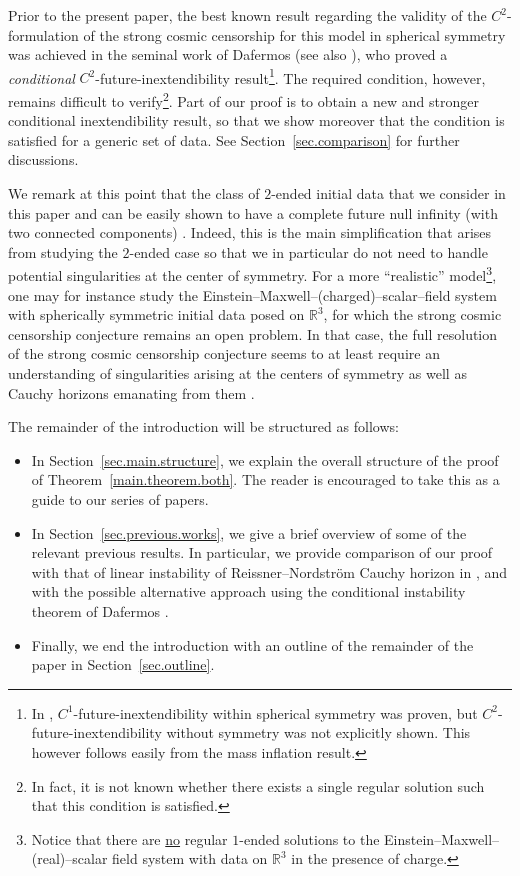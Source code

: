 \documentclass[10pt, reqno]{amsart}
\theoremstyle{definition}
\theoremstyle{remark}
\numberwithin{equation}{section}
\newcommand{\0}{\emptyset}
\begin{document}
Prior to the present paper, the best known result regarding the validity of the $C^2$-formulation of the strong cosmic censorship for this model in spherical symmetry was achieved in the seminal work of Dafermos \cite{D2} (see also \cite{D1, D3}), who proved a \emph{conditional} $C^2$-future-inextendibility result\footnote{In \cite{D2}, $C^1$-future-inextendibility within spherical symmetry was proven, but $C^2$-future-inextendibility without symmetry was not explicitly shown. This however follows easily from the mass inflation result.}. The required condition, however, remains difficult to verify\footnote{In fact, it is not known whether there exists a single regular solution such that this condition is satisfied.}. Part of our proof is to obtain a new and stronger conditional inextendibility result, so that we show moreover that the condition is satisfied for a generic set of data. See Section~\ref{sec.comparison} for further discussions.


We remark at this point that the class of $2$-ended initial data that we consider in this paper and \cite{LO.exterior} can be easily shown to have a complete future null infinity (with two connected components) \cite{DafTrapped}. Indeed, this is the main simplification that arises from studying the $2$-ended case so that we in particular do not need to handle potential singularities at the center of symmetry. For a more ``realistic'' model\footnote{Notice that there are \underline{no} regular $1$-ended solutions to the Einstein--Maxwell--(real)--scalar field system with data on $\mathbb R^3$ in the presence of charge.}, one may for instance study the Einstein--Maxwell--(charged)--scalar--field system with spherically symmetric initial data posed on $\mathbb R^3$, for which the strong cosmic censorship conjecture remains an open problem. In that case, the full resolution of the strong cosmic censorship conjecture seems to at least require an understanding of singularities arising at the centers of symmetry as well as Cauchy horizons emanating from them \cite{Kommemi}.


The remainder of the introduction will be structured as follows:
\begin{itemize}
\item In Section~\ref{sec.main.structure}, we explain the overall structure of the proof of Theorem~\ref{main.theorem.both}. The reader is encouraged to take this as a guide to our series of papers.
\item In Section~\ref{sec.previous.works}, we give a brief overview of some of the relevant previous results. 
In particular, we provide comparison of our proof with that of linear instability of Reissner--Nordstr\"om Cauchy horizon in \cite{LO.instab}, and with the possible alternative approach using the conditional instability theorem of Dafermos \cite{D2}.
\item Finally, we end the introduction with an outline of the remainder of the paper in Section~\ref{sec.outline}.
\end{itemize}
\end{document}
